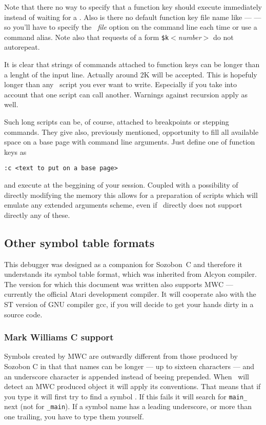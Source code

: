 Note that there no way to specify that a function key should execute
immediately instead of waiting for a . Also is there no default
function key file name 
like ---  --- so you'll have to specify the 
~{\sl file\/}
option on the command line each time or use a command alias.
Note also that requests of a form \verb|$k|{\sl $<$number$>$\/} do not
autorepeat.

It is clear that strings of commands attached to function keys
can be longer than a lenght of the input line.  Actually around
2K will be accepted.  This is hopefuly longer than any \szadb\
script you ever want to write.  Especially if you take into
account that one script can call another.  Warnings against
recursion apply as well.

Such long scripts can be, of course, attached to breakpoints
or stepping commands.  They give also, previously mentioned,
opportunity to fill all available space on a base page with
command line arguments.  Just define one of function keys as
\begin{exmpl}
	{\tt :c <text to put on a base page>}
\end{exmpl}
and execute at the beggining of your session.  Coupled with
a possibility of directly modifying the memory this allows 
for a preparation of scripts which will emulate any extended arguments
scheme, even if \szadb\ directly does not support directly any
of these.

\subsection{Other symbol table formats}

This debugger was designed as a companion for Sozobon~C and therefore
it understands its symbol table format, which was inherited from
Alcyon compiler.
The version for which this document was written also supports MWC ---
currently the official Atari development compiler.
It will cooperate also  with the ST version of GNU compiler gcc,
if you will decide to get your hands dirty in a source code.

\subsubsection{Mark Williams C support}

Symbols created by MWC are outwardly different from those produced
by Sozobon C in that that names can be longer  --- up to
sixteen characters --- and an underscore character is appended instead of
beeing prepended.
When \szadb\ will detect an MWC produced object it will apply its
conventions.
That means that if you type  it will first try
to find a symbol \name{main}.
If this fails it will search for \verb|main_| next  (not for \verb|_main|).
If a symbol name has a leading underscore, or more
than one trailing, you have to type them yourself.

